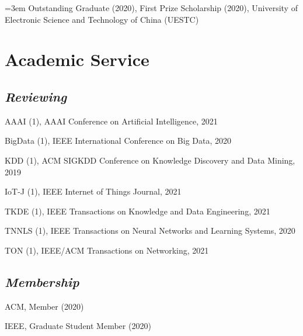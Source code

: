 \documentclass{article}
\begin{document}
\hangindent=3em Outstanding Graduate (2020), First Prize Scholarship (2020), University of Electronic Science and Technology of China (UESTC)

\vspace{-8pt}
\section*{Academic Service}
\vspace{-4pt}


\subsection*{\textnormal{\textit{Reviewing}}}
\vspace{-4pt}
\indent


AAAI (1), AAAI Conference on Artificial Intelligence, 2021

BigData (1), IEEE International Conference on Big Data, 2020

KDD (1), ACM SIGKDD Conference on Knowledge Discovery and Data Mining, 2019

IoT-J (1), IEEE Internet of Things Journal, 2021

TKDE (1), IEEE Transactions on Knowledge and Data Engineering, 2021

TNNLS (1), IEEE Transactions on Neural Networks and Learning Systems, 2020

TON (1), IEEE/ACM Transactions on Networking, 2021

\subsection*{\textnormal{\textit{Membership}}}
\vspace{-4pt}
\indent 

ACM, Member (2020)

IEEE, Graduate Student Member (2020)


\end{document}
